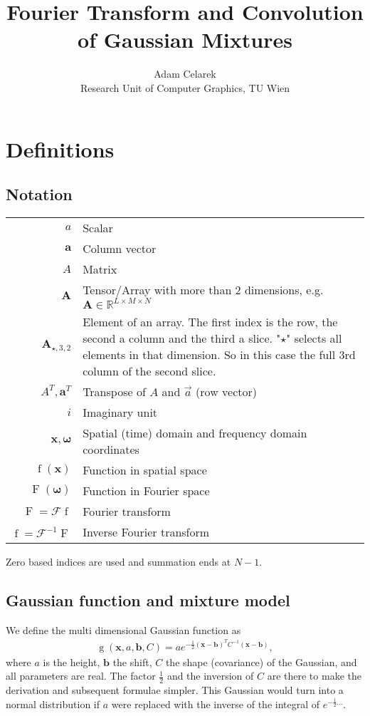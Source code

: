 \documentclass{paper}
\title{Fourier Transform and Convolution of Gaussian Mixtures}
\author{Adam Celarek\\Research Unit of Computer Graphics, TU Wien}
\newcommand{\F}{\ensuremath{\mathcal{F}}}
\newcommand{\vr}[1]{\ensuremath{\boldsymbol{#1}}}
\newcommand{\tr}[1]{\ensuremath{\boldsymbol{#1}}}
\newcommand{\f}[1]{\operatorname{#1}}
\begin{document}
\maketitle

\section{Definitions}
\subsection*{Notation}
\begin{center}
	\begin{supertabular}{rp{8cm}}
		$a$	& Scalar \\
		$\vr{a}$	& Column vector \\
		$A$			& Matrix \\ 
		$\tr{A}$	& Tensor/Array with more than 2 dimensions, e.g. $\tr{A} \in \mathbb{R}^{L \times M \times N}$ \\ 
		$\tr{A}_{\star, 3, 2}$
					& Element of an array.
					The first index is the row, the second a column and the third a slice.
					"$\star$" selects all elements in that dimension.
					So in this case the full 3rd column of the second slice. \\ 
		$A^T, \vr{a}^T$
					& Transpose of $A$ and $\vec{a}$ (row vector) \\
		$i$			& Imaginary unit \\
		$\vr{x}, \vr{\omega}$
					& Spatial (time) domain and frequency domain coordinates \\
		$\f{f}(\vr{x})$
					& Function in spatial space \\
		$\f{F}(\vr{\omega})$
					& Function in Fourier space \\
		$\f{F} = \F \f{f}$
					& Fourier transform \\
		$\f{f} = \F^{-1} \f{F}$
					& Inverse Fourier transform \\
	\end{supertabular}
\end{center}
Zero based indices are used and summation ends at $N-1$.

\subsection*{Gaussian function and mixture model}
We define the multi dimensional Gaussian function as
\begin{align}
\label{eq:gaussian_definition}
\f{g}(\vr{x}, a, \vr{b}, C) = a e^{-\frac{1}{2}(\vr{x}-\vr{b})^TC^{-1}(\vr{x}-\vr{b})},
\end{align}
where $a$ is the height, $\vr{b}$ the shift, $C$ the shape (covariance) of the Gaussian, and all parameters are real.
The factor $\frac{1}{2}$ and the inversion of $C$ are there to make the derivation and subsequent formulae simpler.
This Gaussian would turn into a normal distribution if $a$ were replaced with the inverse of the integral of $e^{-\frac{1}{2}...}$.
\end{document}
